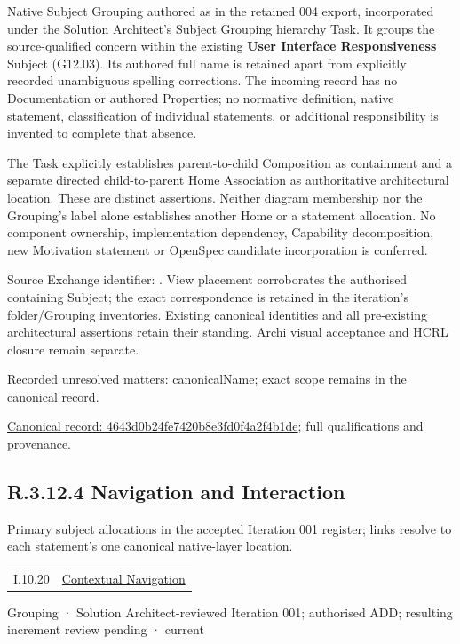 Native Subject Grouping authored as \texttt{} in the retained 004 export,
incorporated under the Solution Architect's Subject Grouping hierarchy Task.
It groups the source-qualified \texttt{} concern within
the existing \textbf{User Interface Responsiveness} Subject (G12.03). Its authored full name
is retained apart from explicitly recorded unambiguous spelling corrections.
The incoming record has no Documentation or authored Properties; no normative
definition, native statement, classification of individual statements, or
additional responsibility is invented to complete that absence.



The Task explicitly establishes parent-to-child Composition as containment and
a separate directed child-to-parent Home Association as authoritative architectural
location. These are distinct assertions. Neither diagram membership nor the
Grouping's label alone establishes another Home or a statement allocation.
No component ownership, implementation dependency, Capability decomposition,
new Motivation statement or OpenSpec candidate incorporation is conferred.



Source Exchange identifier: \texttt{}. View placement corroborates
the authorised containing Subject; the exact correspondence is retained in the
iteration's folder/Grouping inventories. Existing canonical identities and all
pre-existing architectural assertions retain their standing. Archi visual
acceptance and HCRL closure remain separate.


{\small Recorded unresolved matters: canonicalName; exact scope remains in the canonical record.}\par
{\footnotesize \href{../../../../continuum/grouping/4643d0b24fe7420b8e3fd0f4a2f4b1de.md}{Canonical record: 4643d0b24fe7420b8e3fd0f4a2f4b1de}; full qualifications and provenance.}\par
\subsection*{R.3.12.4 Navigation and Interaction}
\label{navigation:R.3.12.4}

Primary subject allocations in the accepted Iteration 001 register; links resolve to each statement’s one canonical native-layer location.\par
\begin{longtable}{p{.22\linewidth}p{.73\linewidth}}
I.10.20 & \hyperref[element:39d698ff446d48ab9358844666fcafe5]{Contextual Navigation} \\
\end{longtable}
\label{element:9f192036bee542ad883b89729a35bbfb}
{\small Grouping · Solution Architect-reviewed Iteration 001; authorised ADD; resulting increment review pending · current}\par

